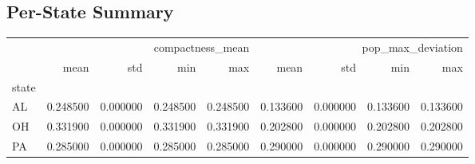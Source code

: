
\subsection{Per-State Summary}
\begin{tabular}{lrrrrrrrr}
\toprule
 & \multicolumn{4}{r}{compactness_mean} & \multicolumn{4}{r}{pop_max_deviation} \\
 & mean & std & min & max & mean & std & min & max \\
state &  &  &  &  &  &  &  &  \\
\midrule
AL & 0.248500 & 0.000000 & 0.248500 & 0.248500 & 0.133600 & 0.000000 & 0.133600 & 0.133600 \\
OH & 0.331900 & 0.000000 & 0.331900 & 0.331900 & 0.202800 & 0.000000 & 0.202800 & 0.202800 \\
PA & 0.285000 & 0.000000 & 0.285000 & 0.285000 & 0.290000 & 0.000000 & 0.290000 & 0.290000 \\
\bottomrule
\end{tabular}
